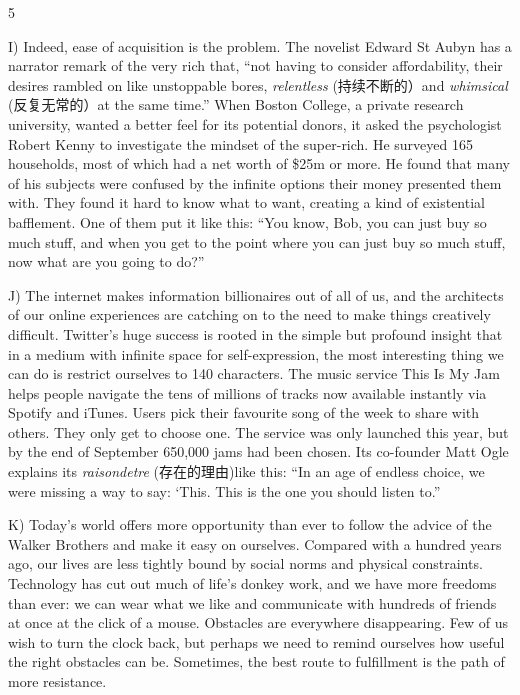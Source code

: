 \documentclass[UTF8,11pt]{ctexart}
\begin{document}
5


I) Indeed, ease of acquisition is the problem. The novelist Edward St Aubyn has a narrator remark of the very rich that, “not having to consider affordability, their desires rambled on like unstoppable bores,\textit{ relentless} (持续不断的）and \textit{whimsical} (反复无常的）at the same time.” When Boston College, a private research university, wanted a better feel for its potential donors, it asked the psychologist Robert Kenny to investigate the mindset of the super-rich. He surveyed 165 households, most of which had a net worth of \$25m or more. He found that many of his subjects were confused by the infinite options their money presented them with. They found it hard to know what to want, creating a kind of existential bafflement. One of them put it like this: “You know, Bob, you can just buy so much stuff, and when you get to the point where you can just buy so much stuff, now what are you going to do?”


J) The internet makes information billionaires out of all of us, and the architects of our online experiences are catching on to the need to make things creatively difficult. Twitter’s huge success is rooted in the simple but profound insight that in a medium with infinite space for self-expression, the most interesting thing we can do is restrict ourselves to 140 characters. The music service This Is My Jam helps people navigate the tens of millions of tracks now available instantly via Spotify and iTunes. Users pick their favourite song of the week to share with others. They only get to choose one. The service was only launched this year, but by the end of September 650,000 jams had been chosen. Its co-founder Matt Ogle explains its\textit{ raisondetre} (存在的理由)like this: “In an age of endless choice, we were missing a way to say: ‘This. This is the one you should listen to.”


K) Today’s world offers more opportunity than ever to follow the advice of the Walker Brothers and make it easy on ourselves. Compared with a hundred years ago, our lives are less tightly bound by social norms and physical constraints. Technology has cut out much of life’s donkey work, and we have more freedoms than ever: we can wear what we like and communicate with hundreds of friends at once at the click of a mouse. Obstacles are everywhere disappearing. Few of us wish to turn the clock back, but perhaps we need to remind ourselves how useful the right obstacles can be. Sometimes, the best route to fulfillment is the path of more resistance.
\end{document}
